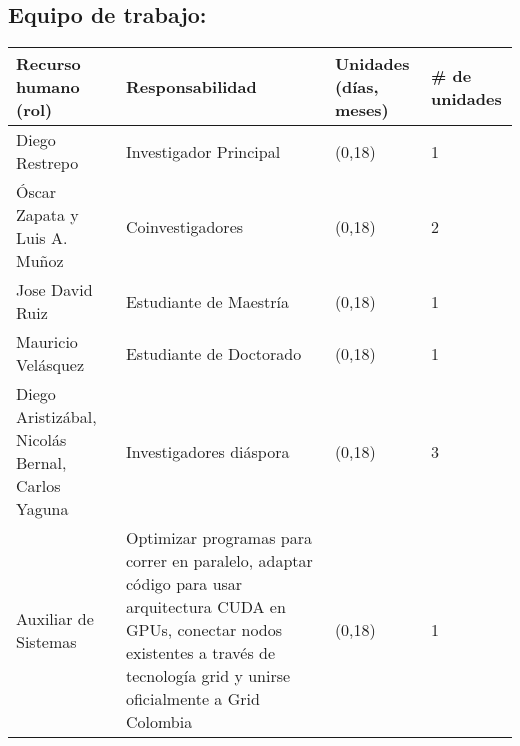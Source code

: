 \subsection{Equipo de trabajo:}
\begin{tabular}{|p{3.7cm}|p{5cm} |l|l|}\hline
Recurso humano (rol)& Responsabilidad& Unidades (días, meses)& \# de unidades\\\hline
Diego Restrepo&Investigador Principal&(0,18)&1\\\hline
Óscar Zapata y Luis A. Muñoz & Coinvestigadores &(0,18)&2\\\hline
Jose David Ruiz & Estudiante de Maestría &(0,18)&1 \\\hline
Mauricio Velásquez & Estudiante de Doctorado &(0,18)&1\\\hline
Diego Aristizábal,
Nicolás Bernal, 
Carlos Yaguna & Investigadores diáspora &(0,18)&3\\\hline
Auxiliar de Sistemas & Optimizar programas para correr en paralelo, 
                       adaptar código para usar arquitectura CUDA en GPUs, 
                       conectar nodos existentes a través de tecnología 
                       grid y unirse oficialmente a Grid Colombia &(0,18)&1\\\hline
\end{tabular}

